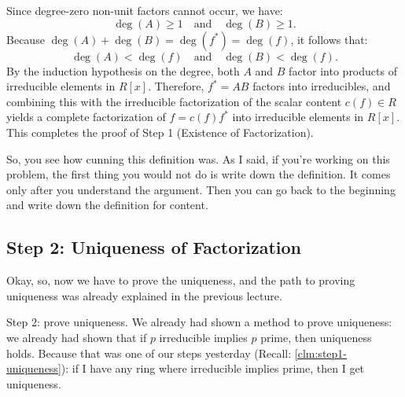 \begin{proofWrapper}
\begin{content}
\begin{steps}
Since degree-zero non-unit factors cannot occur, we have:
\[
\deg(A) \ge 1 \quad \text{and} \quad \deg(B) \ge 1.
\]
Because $\deg(A) + \deg(B) = \deg(f^*) = \deg(f)$, it follows that:
\[
\deg(A) < \deg(f) \quad \text{and} \quad \deg(B) < \deg(f).
\]
By the induction hypothesis on the degree, both $A$ and $B$ factor into products of irreducible elements in $R[x]$. Therefore, $f^* = AB$ factors into irreducibles, and combining this with the irreducible factorization of the scalar content $c(f) \in R$ yields a complete factorization of $f = c(f) f^*$ into irreducible elements in $R[x]$.
This completes the proof of Step 1 (Existence of Factorization).
\end{steps}
\end{content}

\begin{hidden}
\end{hidden}

\begin{speech}[00:30:58 - 00:31:28]
So, you see how cunning this definition was. As I said, if you're working on this problem, the first thing you would not do is write down the definition. It comes only after you understand the argument. Then you can go back to the beginning and write down the definition for content. 
\end{speech}

\subsection{Step 2: Uniqueness of Factorization}

\begin{speech}[00:31:28 - 00:33:17]
Okay, so, now we have to prove the uniqueness, and the path to proving uniqueness was already explained in the previous lecture.

Step 2: prove uniqueness.  We already had shown a method to prove uniqueness: we already had shown that if $p$ irreducible implies $p$ prime, then uniqueness holds.  Because that was one of our steps yesterday (Recall: \cref{clm:step1-uniqueness}): if I have any ring where irreducible implies prime, then I get uniqueness.


\end{speech}
\end{proofWrapper}
